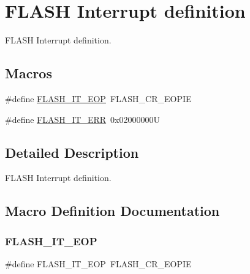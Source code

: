 \hypertarget{group___f_l_a_s_h___interrupt__definition}{}\section{F\+L\+A\+SH Interrupt definition}
\label{group___f_l_a_s_h___interrupt__definition}


F\+L\+A\+SH Interrupt definition.  


\subsection*{Macros}
\begin{DoxyCompactItemize}
\item 
\#define \hyperlink{group___f_l_a_s_h___interrupt__definition_gaea20e80e1806d58a7544cfe8659e7f11}{F\+L\+A\+S\+H\+\_\+\+I\+T\+\_\+\+E\+OP}~F\+L\+A\+S\+H\+\_\+\+C\+R\+\_\+\+E\+O\+P\+IE
\item 
\#define \hyperlink{group___f_l_a_s_h___interrupt__definition_ga4e2c23ab8c1b9a5ee49bf6d695d9ae8c}{F\+L\+A\+S\+H\+\_\+\+I\+T\+\_\+\+E\+RR}~0x02000000U
\end{DoxyCompactItemize}


\subsection{Detailed Description}
F\+L\+A\+SH Interrupt definition. 



\subsection{Macro Definition Documentation}
\mbox{\label{group___f_l_a_s_h___interrupt__definition_gaea20e80e1806d58a7544cfe8659e7f11}} 
\subsubsection{\texorpdfstring{F\+L\+A\+S\+H\+\_\+\+I\+T\+\_\+\+E\+OP}{FLASH\_IT\_EOP}}
{\footnotesize\ttfamily \#define F\+L\+A\+S\+H\+\_\+\+I\+T\+\_\+\+E\+OP~F\+L\+A\+S\+H\+\_\+\+C\+R\+\_\+\+E\+O\+P\+IE}

